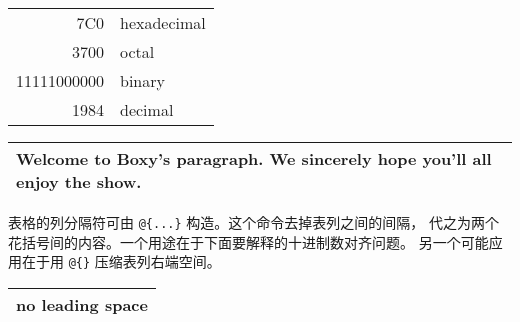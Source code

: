 \begin{example}
\begin{tabular}{|r|l|}
\hline
7C0 & hexadecimal \\
3700 & octal \\ \cline{2-2}
11111000000 & binary \\
\hline \hline
1984 & decimal \\
\hline
\end{tabular}
\end{example}

\begin{example}
\begin{tabular}{|p{4.7cm}|}
\hline
Welcome to Boxy's paragraph.
We sincerely hope you'll
all enjoy the show.\\
\hline
\end{tabular}
\end{example}

表格的列分隔符可由 \verb|@{...}| 构造。这个命令去掉表列之间的间隔，
代之为两个花括号间的内容。一个用途在于下面要解释的十进制数对齐问题。
另一个可能应用在于用 \verb|@{}| 压缩表列右端空间。

\begin{example}
\begin{tabular}{@{} l @{}}
\hline
no leading space\\
\hline
\end{tabular}
\end{example}

